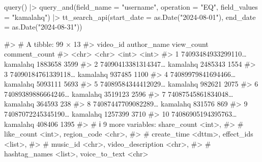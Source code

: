 \documentclass[
  nobib]{ccr}
\newenvironment{Shaded}{\begin{snugshade}}{\end{snugshade}}
\newcommand{\AttributeTok}[1]{\textcolor[rgb]{0.40,0.45,0.13}{#1}}
\newcommand{\CommentTok}[1]{\textcolor[rgb]{0.37,0.37,0.37}{#1}}
\newcommand{\FunctionTok}[1]{\textcolor[rgb]{0.28,0.35,0.67}{#1}}
\newcommand{\NormalTok}[1]{\textcolor[rgb]{0.00,0.23,0.31}{#1}}
\newcommand{\SpecialCharTok}[1]{\textcolor[rgb]{0.37,0.37,0.37}{#1}}
\newcommand{\StringTok}[1]{\textcolor[rgb]{0.13,0.47,0.30}{#1}}
\begin{document}
\begin{Shaded}
\begin{Highlighting}[]
\FunctionTok{query}\NormalTok{() }\SpecialCharTok{|\textgreater{}}
  \FunctionTok{query\_and}\NormalTok{(}\AttributeTok{field\_name =} \StringTok{"username"}\NormalTok{,}
            \AttributeTok{operation =} \StringTok{"EQ"}\NormalTok{,}
            \AttributeTok{field\_values =} \StringTok{"kamalahq"}\NormalTok{) }\SpecialCharTok{|\textgreater{}}
  \FunctionTok{tt\_search\_api}\NormalTok{(}\AttributeTok{start\_date =} \FunctionTok{as.Date}\NormalTok{(}\StringTok{"2024{-}08{-}01"}\NormalTok{),}
                \AttributeTok{end\_date =} \FunctionTok{as.Date}\NormalTok{(}\StringTok{"2024{-}08{-}31"}\NormalTok{))}

\CommentTok{\#\textgreater{} \# A tibble: 99 × 13}
\CommentTok{\#\textgreater{}    video\_id           author\_name view\_count comment\_count}
\CommentTok{\#\textgreater{}    \textless{}chr\textgreater{}              \textless{}chr\textgreater{}            \textless{}int\textgreater{}         \textless{}int\textgreater{} }
\CommentTok{\#\textgreater{}  1 74093484933299110… kamalahq       1883658          3599 }
\CommentTok{\#\textgreater{}  2 74090413381314347… kamalahq       2485343          1554 }
\CommentTok{\#\textgreater{}  3 74090184761339118… kamalahq        937485          1100}
\CommentTok{\#\textgreater{}  4 74089979841694466… kamalahq       5093111          5693}
\CommentTok{\#\textgreater{}  5 74089584344412029… kamalahq        982621          2075 }
\CommentTok{\#\textgreater{}  6 74089389886664246… kamalahq       3519123          2596}
\CommentTok{\#\textgreater{}  7 74087545861834048… kamalahq        364593           238}
\CommentTok{\#\textgreater{}  8 74087447709082289… kamalahq        831576           869}
\CommentTok{\#\textgreater{}  9 74087072245345190… kamalahq       1257399          3710}
\CommentTok{\#\textgreater{} 10 74086905194395763… kamalahq        408406          1395 }
\CommentTok{\#\textgreater{} \# ℹ 9 more variables: share\_count \textless{}int\textgreater{},}
\CommentTok{\#\textgreater{} \#   like\_count \textless{}int\textgreater{}, region\_code \textless{}chr\textgreater{},}
\CommentTok{\#\textgreater{} \#   create\_time \textless{}dttm\textgreater{}, effect\_ids \textless{}list\textgreater{},}
\CommentTok{\#\textgreater{} \#   music\_id \textless{}chr\textgreater{}, video\_description \textless{}chr\textgreater{},}
\CommentTok{\#\textgreater{} \#   hashtag\_names \textless{}list\textgreater{}, voice\_to\_text \textless{}chr\textgreater{}}
\end{Highlighting}
\end{Shaded}
\end{document}
